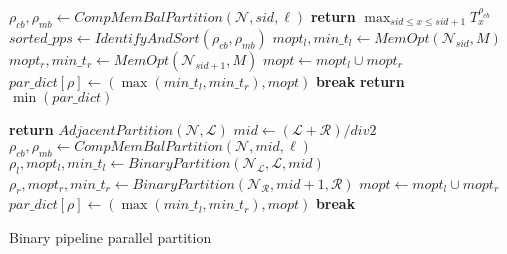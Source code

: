 \begin{algorithm}[t]
  {
    $\rho_{cb},\rho_{mb} \leftarrow CompMemBalPartition(\mathcal{N}, sid, \ell)$\;
    {
      \textbf{return} $\max_{sid \le x \le sid+1} T_x^{\rho_{cb}}$\;
    }
    $sorted\_pps \leftarrow IdentifyAndSort(\rho_{cb},\rho_{mb})$\;
    {
      $mopt_l,min\_t_l \leftarrow MemOpt(\mathcal{N}_{sid},M)$\;
      $mopt_r,min\_t_r \leftarrow MemOpt(\mathcal{N}_{sid+1},M)$\;
      $mopt \leftarrow mopt_l \cup mopt_r$\;
      $par\_dict[\rho] \leftarrow (\max(min\_t_l,min\_t_r),mopt)$\;
      {
        \textbf{break}\;
      }
    }
    \textbf{return} $\min(par\_dict)$
  }
  
  {
    {
      \textbf{return} $AdjacentPartition(\mathcal{N},\mathcal{L})$\;
    }
    $mid \leftarrow (\mathcal{L}+\mathcal{R}) /div 2$\;
    $\rho_{cb},\rho_{mb} \leftarrow CompMemBalPartition(\mathcal{N}, mid, \ell)$\;
    {
      $\rho_l,mopt_l,min\_t_l \leftarrow BinaryPartition(\mathcal{N}_{\mathcal{L}},\mathcal{L},mid)$\;
      $\rho_r,mopt_r,min\_t_r \leftarrow BinaryPartition(\mathcal{N}_{\mathcal{R}},mid+1,\mathcal{R})$\;
      $mopt \leftarrow mopt_l \cup mopt_r$\;
      $par\_dict[\rho] \leftarrow (\max(min\_t_l,min\_t_r),mopt)$\;
      {
        \textbf{break}\;
      }
    }
  }

\caption{Binary pipeline parallel partition}
\label{alg:binary-partition}
\end{algorithm}

